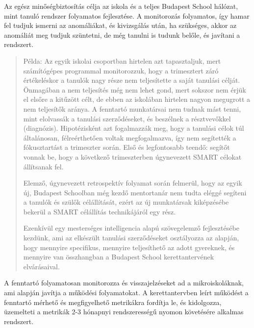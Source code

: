 Az egész minőségbiztosítás célja az iskola és a teljes  Budapest School hálózat, mint tanuló rendszer folyamatos fejlesztése. A monitorozás folyamatos, így hamar fel tudjuk ismerni az anomáliákat, és kivizsgálás után, ha szükséges, akkor az anomáliát meg tudjuk szüntetni, de még tanulni is tudunk belőle, és javítani a rendszert.
\begin{quote}
Példa: Az egyik iskolai csoportban hirtelen azt tapasztaljuk, mert számítógépes programmal monitorozzuk, hogy a trimesztert záró értékeléskor a tanulók nagy része nem teljesítette a saját tanulási célját. Önmagában a nem teljesítés még nem lehet gond, mert sokszor nem érjük el elsőre a kitűzött célt, de ebben az iskolában hirtelen nagyon megugrott a nem teljesítők aránya. A fenntartó munkatársai nem tudnak mást tenni, mint elolvassák a tanulási szerződéseket, és beszélnek a résztvevőkkel (diagnózis). Hipotézisként azt fogalmazzák meg, hogy a tanulási célok túl általánosan, félreérthetően voltak megfogalmazva, így nem segítették a fókusztartást a trimeszter során. Első és legfontosabb teendő: segítőt vonnak be, hogy a következő trimeszterben úgynevezett SMART \citep{wiki:smart} célokat állítsanak fel.

Elemző, úgynevezett retrospektív folyamat során felmerül, hogy az egyik új, Budapest Schoolban még kezdő mentortanár nem tudta eléggé segíteni a tanulók és szülők célállítását, ezért az új munkatársak kiképzésébe bekerül a SMART célállítás technikájáról egy rész.

Ezenkívül egy mesterséges intelligencia alapú szövegelemző fejlesztésébe kezdünk, ami az elkészült tanulási szerződéseket osztályozza az alapján, hogy mennyire specifikus, mennyire teljesíthető az adott gyereknek, és mennyire van összhangban a Budapest School kerettantervének elvárásaival.
\end{quote}




A fenntartó folyamatosan monitorozza és visszajelzéseket ad a mikroiskoláknak, ami alapján javítja a működési folyamatokat. A kerettantervben leírt működést a fenntartó mérhető és megfigyelhető metrikákra fordítja le, és kidolgozza, üzemelteti a metrikák 2-3 hónapnyi rendszerességű nyomon követésére alkalmas rendszert.

